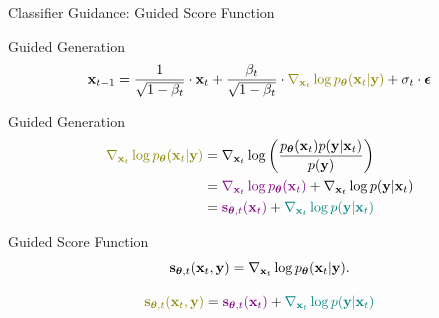 \documentclass{beamer}
\renewcommand{\eqpause}{}
\renewcommand{\nextonslide}[1]{#1}
\begin{document}
\begin{frame}{Classifier Guidance: Guided Score Function}
	\begin{block}{Guided Generation}
		\vspace{-0.5cm}
		\[
			\bx_{t - 1} = \frac{1}{\sqrt{1 - \beta_t}}\cdot \bx_t +  \frac{\beta_t}{\sqrt{1 - \beta_t}}  \cdot {\color{olive} \nabla_{\bx_t} \log \pt(\bx_t | \by)} +  \sigma_t \cdot \bepsilon
		\]
		\vspace{-0.5cm}
	\end{block}
	\eqpause
	\begin{block}{Guided Generation}
		\vspace{-0.7cm}
		\begin{align*}
			{\color{olive}\nabla_{\bx_t} \log \pt(\bx_t | \by)} &= \nabla_{\bx_t} \log \left(\frac{\pt(\bx_t)p(\by | \bx_t)}{p(\by)} \right)\\
			\nextonslide{
			&= {\color{violet}\nabla_{\bx_t} \log \pt(\bx_t)} + \nabla_{\bx_t} \log p(\by | \bx_t) \\
			}
			\nextonslide{
			&= {\color{violet} \bs_{\btheta, t}(\bx_t)} + {\color{teal}\nabla_{\bx_t} \log p(\by | \bx_t)}
			}
		\end{align*}
	\end{block}
	\vspace{-0.5cm}
	\eqpause
	\begin{block}{Guided Score Function}
		\vspace{-0.3cm}
		\[
			\mathbf{s}_{\boldsymbol{\theta}, t}(\mathbf{x}_t, \mathbf{y}) = \nabla_{\mathbf{x}_t} \log p_{\boldsymbol{\theta}}(\mathbf{x}_t | \mathbf{y}).
		\]
		\eqpause
		\vspace{-0.3cm}
		\[
			{\color{olive}\bs_{\btheta, t}(\bx_t, \by)} = {\color{violet}\bs_{\btheta, t}(\bx_t)} + {\color{teal}\nabla_{\bx_t} \log p(\by | \bx_t)}
		\]
	\end{block}
\end{frame}
\end{document}
